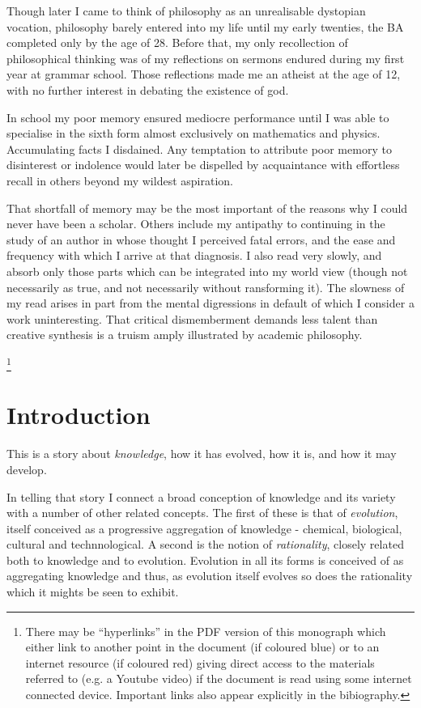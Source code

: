 \documentclass[10pt,titlepage]{book}
\begin{document}
Though later I came to think of philosophy as an unrealisable dystopian vocation, philosophy barely entered into my life until my early twenties, the BA completed only by the age of 28.
Before that, my only recollection of philosophical thinking was of my reflections on sermons endured during my first year at grammar school.
Those reflections made me an atheist at the age of 12, with no further interest in debating the existence of god.

In school my poor memory ensured mediocre performance until I was able to specialise in the sixth form almost exclusively on mathematics and physics.
Accumulating facts I disdained.
Any temptation to attribute poor memory to disinterest or indolence would later be dispelled by acquaintance with effortless recall in others beyond my wildest aspiration.

That shortfall of memory may be the most important of the reasons why I could never have been a scholar.
Others include my antipathy to continuing in the study of an author in whose thought I perceived fatal errors, and the ease and frequency with which I arrive at that diagnosis.
I also read very slowly, and absorb only those parts which can be integrated into my world view (though not necessarily as true, and not necessarily without ransforming it).
The slowness of my read arises in part from the mental digressions in default of which I consider a work uninteresting.
That critical dismemberment demands less talent than creative synthesis is a truism amply illustrated by academic philosophy.

\footnote{There may be ``hyperlinks'' in the PDF version of this monograph which either link to another point in the document  (if coloured blue) or to an internet resource  (if coloured red) giving direct access to the materials referred to (e.g. a Youtube video) if the document is read using some internet connected device.
  Important links also appear explicitly in the bibiography.}

\chapter{Introduction}

This is a story about \emph{knowledge}, how it has evolved, how it is, and how it may develop.

In telling that story I connect a broad conception of knowledge and its variety with a number of other related concepts.
The first of these is that of \emph{evolution}, itself conceived as a progressive aggregation of knowledge -  chemical, biological, cultural and technnological.
A second is the notion of \emph{rationality}, closely related both to knowledge and to evolution.
Evolution in all its forms is conceived of as aggregating knowledge and thus, as evolution itself evolves so does the rationality which it mights be seen to exhibit.
\end{document}
